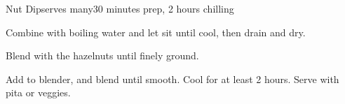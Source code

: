 \documentclass[../Cookbook.tex]{subfiles}
\begin{document}
\begin{recipe}{Nut Dip}{serves many}{30 minutes prep, 2 hours chilling}

Combine with boiling water and let sit until cool, then drain and dry.

Blend with the hazelnuts until finely ground.

Add to blender, and blend until smooth. Cool for at least 2 hours. Serve with pita or veggies.

\end{recipe}
\end{document}
